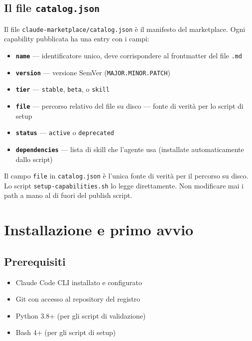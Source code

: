 \documentclass[12pt,a4paper,twoside]{book}
\begin{document}
\section{Il file \texttt{catalog.json}}

Il file \texttt{claude-marketplace/catalog.json} è il manifesto del marketplace. Ogni capability pubblicata ha una entry con i campi:

\begin{itemize}
  \item \textbf{\texttt{name}} — identificatore unico, deve corrispondere al frontmatter del file \texttt{.md}
  \item \textbf{\texttt{version}} — versione SemVer (\texttt{MAJOR.MINOR.PATCH})
  \item \textbf{\texttt{tier}} — \texttt{stable}, \texttt{beta}, o \texttt{skill}
  \item \textbf{\texttt{file}} — percorso relativo del file su disco — fonte di verità per lo script di setup
  \item \textbf{\texttt{status}} — \texttt{active} o \texttt{deprecated}
  \item \textbf{\texttt{dependencies}} — lista di skill che l'agente usa (installate automaticamente dallo script)
\end{itemize}

\begin{attenzione}
Il campo \texttt{file} in \texttt{catalog.json} è l'unica fonte di verità per il percorso su disco. Lo script \texttt{setup-capabilities.sh} lo legge direttamente. Non modificare mai i path a mano al di fuori del publish script.
\end{attenzione}

\chapter{Installazione e primo avvio}

\section{Prerequisiti}

\begin{itemize}
  \item Claude Code CLI installato e configurato
  \item Git con accesso al repository del registro
  \item Python 3.8+ (per gli script di validazione)
  \item Bash 4+ (per gli script di setup)
\end{itemize}
\end{document}
